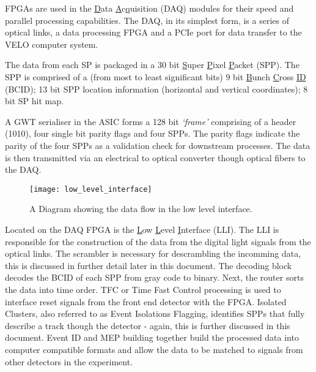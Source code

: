       FPGAs are used in the \underline{D}ata \underline{A}c\underline{q}uisition (DAQ) modules for their speed and parallel processing capabilities.
      The DAQ, in its simplest form, is a series of optical links, a data processing FPGA and a PCIe port for data transfer to the VELO computer system.
      \par
      The data from each SP is packaged in a 30 bit \underline{S}uper \underline{P}ixel \underline{P}acket (SPP). The SPP is comprised of  a (from most to least significant bits) 9 bit \underline{B}unch \underline{C}ross \underline{ID} (BCID); 13 bit SPP location information (horizontal and vertical coordinates); 8 bit SP hit map.
      \par
      A GWT serialiser in the ASIC forms a 128 bit \textit{`frame'} comprising of a header (1010), four single bit parity flags and four SPPs.
      The parity flags indicate the parity of the four SPPs as a validation check for downstream processes.
      The data is then transmitted via an electrical to optical converter though optical fibers to the DAQ.
      \begin{figure}[ht]
        \centering
        \texttt{[image: low\_level\_interface]}
        \caption{A Diagram showing the data flow in the low level interface.}
        \label{fig:lli}
      \end{figure}
      Located on the DAQ FPGA is the \underline{L}ow \underline{L}evel \underline{I}nterface (LLI).
      The LLI is responsible for the construction of the data from the digital light signals from the optical links.
      The scrambler is necessary for descrambling the incomming data, this is discussed in further detail later in this document.
      The decoding block decodes the BCID of each SPP from gray code to binary.
      Next, the router sorts the data into time order.
      TFC or Time Fast Control processing is used to interface reset signals from the front end detector with the FPGA.
      Isolated Clusters, also referred to as Event Isolations Flagging, identifies SPPs that fully describe a track though the detector - again, this is further discussed in this document.
      Event ID and MEP building together build the processed data into computer compatible formats and allow the data to be matched to signals from other detectors in the experiment.